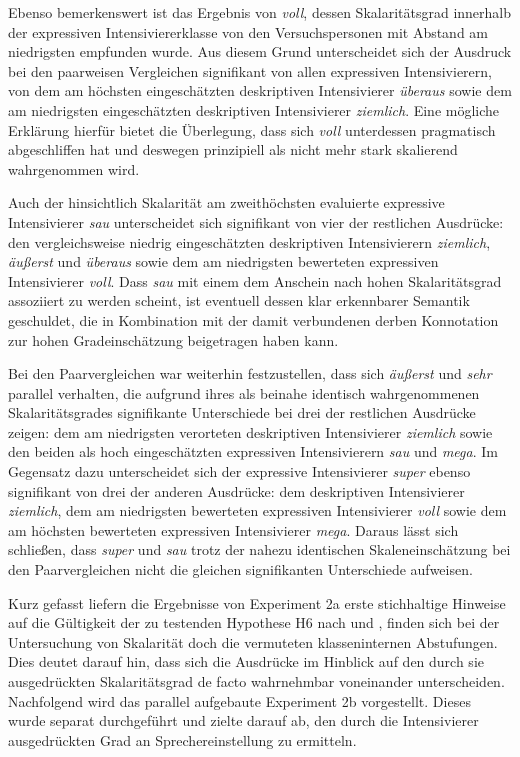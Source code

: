 Ebenso bemerkenswert ist das Ergebnis von \textit{voll}, dessen Skalaritätsgrad innerhalb der expressiven Intensiviererklasse von den Versuchspersonen mit Abstand am niedrigsten empfunden wurde. Aus diesem Grund unterscheidet sich der Ausdruck bei den paarweisen Vergleichen signifikant von allen expressiven Intensivierern, von dem am höchsten eingeschätzten deskriptiven Intensivierer \textit{überaus} sowie dem am niedrigsten eingeschätzten deskriptiven Intensivierer \textit{ziemlich}. Eine mögliche Erklärung hierfür bietet die Überlegung, dass sich \textit{voll} unterdessen pragmatisch abgeschliffen hat und deswegen prinzipiell als nicht mehr stark skalierend {wahrgenommen wird}.


Auch der hinsichtlich Skalarität am zweithöchsten evaluierte expressive Intensivierer \textit{sau} unterscheidet sich signifikant von vier der restlichen Ausdrücke: den vergleichsweise niedrig eingeschätzten deskriptiven Intensivierern \textit{ziemlich}, \textit{äußerst} und \textit{überaus} sowie dem am niedrigsten bewerteten expressiven Intensivierer \textit{voll}. Dass \textit{sau} mit einem dem Anschein nach hohen Skalaritätsgrad assoziiert zu werden scheint, ist eventuell dessen klar erkennbarer Semantik geschuldet, die in Kombination mit der damit verbundenen derben Konnotation zur hohen Gradeinschätzung beigetragen haben kann.


Bei den Paarvergleichen war weiterhin festzustellen, dass sich \textit{äußerst} und \textit{sehr} parallel verhalten, die aufgrund ihres als beinahe identisch wahrgenommenen Skalaritätsgrades signifikante Unterschiede bei drei der restlichen Ausdrücke zeigen: dem am niedrigsten verorteten deskriptiven Intensivierer \textit{ziemlich} sowie den beiden als hoch eingeschätzten expressiven Intensivierern \textit{sau} und \textit{mega}. Im Gegensatz dazu unterscheidet sich der expressive Intensivierer \textit{super} ebenso signifikant von drei der anderen Ausdrücke: dem deskriptiven Intensivierer \textit{ziemlich}, dem am niedrigsten bewerteten expressiven Intensivierer \textit{voll} sowie dem am höchsten bewerteten expressiven Intensivierer \textit{mega}. Daraus lässt sich schließen, dass \textit{super} und \textit{sau} trotz der nahezu identischen Skaleneinschätzung bei den Paarvergleichen nicht die gleichen signifikanten Unterschiede aufweisen.


Kurz gefasst liefern die Ergebnisse von Experiment 2a erste stichhaltige Hinweise auf die Gültigkeit der zu testenden Hypothese H6 nach \citet[87]{Biedermann.1969} und \citet[408]{Breindl.2007}, finden sich bei der Untersuchung von Skalarität doch die vermuteten klasseninternen Abstufungen. Dies deutet darauf hin, dass sich die Ausdrücke im Hinblick auf den durch sie ausgedrückten Skalaritätsgrad de facto wahrnehmbar voneinander unterscheiden. Nachfolgend wird das parallel aufgebaute {Experiment 2b} vorgestellt. Dieses wurde separat durchgeführt und zielte darauf ab, den durch die Intensivierer ausgedrückten Grad an Sprechereinstellung zu ermitteln.

